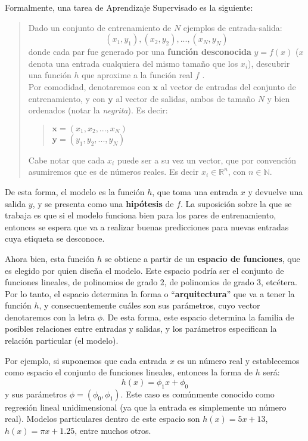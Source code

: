 \documentclass[../../main.tex]{subfiles}
\begin{document}
Formalmente, una tarea de Aprendizaje Supervisado es la siguiente:
\begin{quote}
    Dado un conjunto de entrenamiento de \(N\) ejemplos de entrada-salida:
    \[(x_1, y_1), (x_2, y_2), ..., (x_N, y_N)\]
    donde cada par fue generado por una \textbf{función desconocida} \(y=f(x)\) (\(x\) denota una entrada cualquiera del mismo tamaño que los \(x_i\)), descubrir una función \(h\) que aproxime a la función real \(f\) \cite{ai-a-modern-approach}.\\
    Por comodidad, denotaremos con \(\mathbf{x}\) al vector de entradas del conjunto de entrenamiento, y con \(\mathbf{y}\) al vector de salidas, ambos de tamaño \(N\) y bien ordenados (notar la \textit{negrita}). Es decir:
    \begin{quote}
        \(\mathbf{x}=(x_1, x_2, ..., x_N)\)\\
        \(\mathbf{y}=(y_1, y_2, ..., y_N)\)
    \end{quote}
    Cabe notar que cada \(x_i\) puede ser a su vez un vector, que por convención asumiremos que es de números reales. Es decir \(x_i \in \mathbb{R}^n\), con \(n \in \mathbb{N}\).
\end{quote}
De esta forma, el modelo es la función \(h\), que toma una entrada \(x\) y devuelve una salida \(y\), y se presenta como una \textbf{hipótesis} de \(f\). La suposición sobre la que se trabaja es que si el modelo funciona bien para los pares de entrenamiento, entonces se espera que va a realizar buenas predicciones para nuevas entradas cuya etiqueta se desconoce.

Ahora bien, esta función \(h\) se obtiene a partir de un \textbf{espacio de funciones}, que es elegido por quien diseña el modelo. Este espacio podría ser el conjunto de funciones lineales, de polinomios de grado 2, de polinomios de grado 3, etcétera. Por lo tanto, el espacio determina la forma o ``\textbf{arquitectura}'' que va a tener la función \(h\), y consecuentemente cuáles son sus parámetros, cuyo vector denotaremos con la letra \(\phi\). De esta forma, este espacio determina la familia de posibles relaciones entre entradas y salidas, y los parámetros especifican la relación particular (el modelo).

Por ejemplo, si suponemos que cada entrada \(x\) es un número real y establecemos como espacio el conjunto de funciones lineales, entonces la forma de \(h\) será:
\[h(x) = \phi_1 x + \phi_0\]
y sus parámetros \(\phi=(\phi_0, \phi_1)\). Este caso es comúnmente conocido como regresión lineal unidimensional (ya que la entrada es simplemente un número real). Modelos particulares dentro de este espacio son \(h(x) = 5x + 13\), \(h(x) = \pi x + 1.25\), entre muchos otros. 
\end{document}

